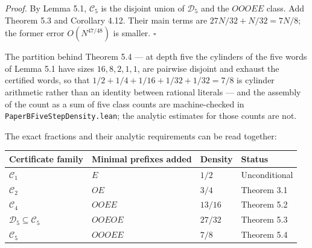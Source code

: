 \documentclass[11pt,a4paper]{article}
\begin{document}
\emph{Proof.} By Lemma 5.1, \(\mathcal C_5\) is the disjoint union of
\(\mathcal D_5\) and the \(OOOEE\) class. Add Theorem 5.3 and Corollary
4.12. Their main terms are \(27N/32+N/32=7N/8\); the former error
\(O(N^{47/48})\) is smaller. \(\square\)

The partition behind Theorem 5.4 --- at depth five the cylinders of the
five words of Lemma 5.1 have sizes \(16,8,2,1,1\), are pairwise disjoint
and exhaust the certified words, so that \(1/2+1/4+1/16+1/32+1/32=7/8\)
is cylinder arithmetic rather than an identity between rational literals
--- and the assembly of the count as a sum of five class counts are
machine-checked in \texttt{PaperBFiveStepDensity.lean}; the analytic
estimates for those counts are not.

The exact fractions and their analytic requirements can be read
together:

\begingroup\small

\begin{longtable}[]{@{}
  >{\raggedright\arraybackslash}p{}
  >{\raggedright\arraybackslash}p{}
  >{\raggedright\arraybackslash}p{}
  >{\raggedright\arraybackslash}p{}@{}}
\toprule\noalign{}
\begin{minipage}[b]{\linewidth}\raggedright
Certificate family
\end{minipage} & \begin{minipage}[b]{\linewidth}\raggedright
Minimal prefixes added
\end{minipage} & \begin{minipage}[b]{\linewidth}\raggedright
Density
\end{minipage} & \begin{minipage}[b]{\linewidth}\raggedright
Status
\end{minipage} \\
\midrule\noalign{}
\endhead
\bottomrule\noalign{}
\endlastfoot
\(\mathcal C_1\) & \(E\) & \(1/2\) & Unconditional \\
\(\mathcal C_2\) & \(OE\) & \(3/4\) & Theorem 3.1 \\
\(\mathcal C_4\) & \(OOEE\) & \(13/16\) & Theorem 5.2 \\
\(\mathcal D_5\subseteq\mathcal C_5\) & \(OOEOE\) & \(27/32\) & Theorem
5.3 \\
\(\mathcal C_5\) & \(OOOEE\) & \(7/8\) & Theorem 5.4 \\
\end{longtable}
\end{document}

